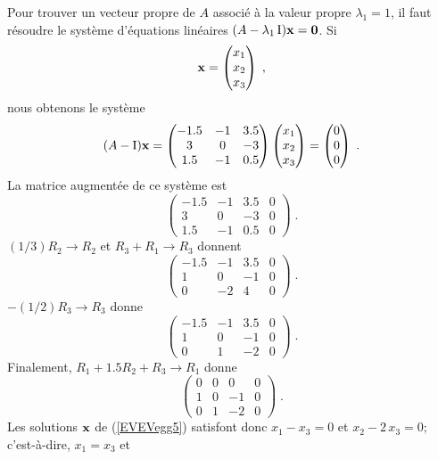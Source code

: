 {\begin{egg}
Pour trouver un vecteur propre de $A$ associé à la valeur propre
$\lambda_1=1$, il faut résoudre le système d'équations linéaires
$(A-\lambda_1 \operatorname{I}) \mathbf{x} = \mathbf{0}$.  Si
\[
\mathbf{x} =
\begin{pmatrix}
x_1 \\ x_2 \\ x_3
\end{pmatrix} \; ,
\]
nous obtenons le système
\begin{equation}\label{EVEVegg5}
(A - \operatorname{I})\mathbf{x} =
\begin{pmatrix}
-1.5 & -1 & 3.5 \\ 3 & 0 & -3 \\ 1.5 & -1 & 0.5
\end{pmatrix}
\begin{pmatrix}
x_1 \\ x_2 \\ x_3
\end{pmatrix}
=
\begin{pmatrix}
0 \\ 0 \\ 0
\end{pmatrix} \; .
\end{equation}
La matrice augmentée de ce système est
\[
\left(\begin{array}{rrr|r}
-1.5 & -1 & 3.5 & 0 \\ 3 & 0 & -3 & 0 \\ 1.5 & -1 & 0.5 & 0
\end{array}\right) \; .
\]
$(1/3)R_2 \to R_2$ et $R_3 + R_1 \to R_3$ donnent
\[
\left(\begin{array}{rrr|r}
-1.5 & -1 & 3.5 & 0 \\ 1 & 0 & -1 & 0 \\ 0 & -2 & 4 & 0
\end{array}\right) \; .
\]
$-(1/2) R_3 \to R_3$ donne
\[
\left(\begin{array}{rrr|r}
-1.5 & -1 & 3.5 & 0 \\ 1 & 0 & -1 & 0 \\ 0 & 1 & -2 & 0
\end{array}\right) \; .
\]
Finalement, $R_1 + 1.5 R_2 + R_3 \to R_1$ donne
\[
\left(\begin{array}{rrr|r}
0 & 0 & 0 & 0 \\ 1 & 0 & -1 & 0 \\ 0 & 1 & -2 & 0
\end{array}\right) \; .
\]
Les solutions $\mathbf{x}$ de (\ref{EVEVegg5}) satisfont donc
$x_1 - x_3 = 0$ et $x_2 -2\,x_3 =0$; c'est-à-dire, $x_1=x_3$ et

\end{egg}}
